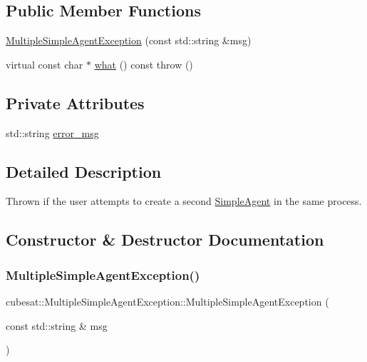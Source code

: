 \subsection*{Public Member Functions}
\begin{DoxyCompactItemize}
\item 
\hyperlink{classcubesat_1_1MultipleSimpleAgentException_a5af0ba65456487dd0c08e5e0c764cccf}{Multiple\+Simple\+Agent\+Exception} (const std\+::string \&msg)
\item 
virtual const char $\ast$ \hyperlink{classcubesat_1_1MultipleSimpleAgentException_a01fc1d1216da063be9c5cf49e7885265}{what} () const  throw ()
\end{DoxyCompactItemize}
\subsection*{Private Attributes}
\begin{DoxyCompactItemize}
\item 
std\+::string \hyperlink{classcubesat_1_1MultipleSimpleAgentException_ab7a3c4ac9d8c35c62d5d91395c8d4576}{error\+\_\+msg}
\end{DoxyCompactItemize}


\subsection{Detailed Description}
Thrown if the user attempts to create a second \hyperlink{classcubesat_1_1SimpleAgent}{Simple\+Agent} in the same process. 

\subsection{Constructor \& Destructor Documentation}
\mbox{\label{classcubesat_1_1MultipleSimpleAgentException_a5af0ba65456487dd0c08e5e0c764cccf}} 
\subsubsection{\texorpdfstring{Multiple\+Simple\+Agent\+Exception()}{MultipleSimpleAgentException()}}
{\footnotesize\ttfamily cubesat\+::\+Multiple\+Simple\+Agent\+Exception\+::\+Multiple\+Simple\+Agent\+Exception (\begin{DoxyParamCaption}\item[{const std\+::string \&}]{msg }\end{DoxyParamCaption})\hspace{0.3cm}{\ttfamily [inline]}}




